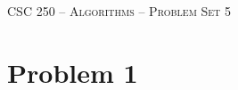 \documentclass[11pt]{article}
\theoremstyle{nonumberplain}
\newcommand{\ttt}[1]{\texttt{{#1}}}
\begin{document}



\begin{center}

{\LARGE
\textsc{CSC 250 -- Algorithms -- Problem Set 5}
\bigskip}

\bigskip

\end{center}




\section*{Problem 1}



\end{document}
